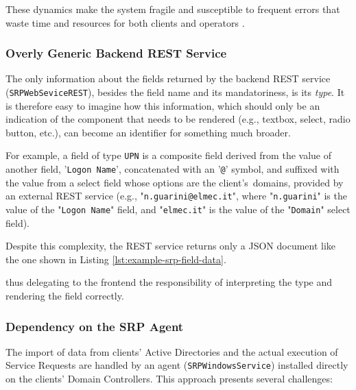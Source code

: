 These dynamics make the system fragile and susceptible to frequent errors that waste time and resources for both clients and operators \cite{benefits_issues_micro_frontends}.

\subsubsection{Overly Generic Backend REST Service}

The only information about the fields returned by the backend REST service (\texttt{SRPWebSeviceREST}), besides the field name and its mandatoriness, is its \textit{type}. It is therefore easy to imagine how this information, which should only be an indication of the component that needs to be rendered (e.g., textbox, select, radio button, etc.), can become an identifier for something much broader.

For example, a field of type \texttt{UPN} is a composite field derived from the value of another field, '\texttt{Logon Name}', concatenated with an '\texttt{@}' symbol, and suffixed with the value from a select field whose options are the client's~domains, provided by an external REST service (e.g., "\texttt{n.guarini@elmec.it}", where "\texttt{n.guarini}" is the value of the "\texttt{Logon Name}" field, and "\texttt{elmec.it}" is the value of the "\texttt{Domain}" select field). 

Despite this complexity, the REST service returns only a JSON document like the one shown in Listing \ref{lst:example-srp-field-data}.

thus delegating to the frontend the responsibility of interpreting the type and rendering the field correctly.

\subsubsection{Dependency on the SRP Agent}

The import of data from clients' Active Directories and the actual execution of Service Requests are handled by an agent (\texttt{SRPWindowsService}) installed directly on the clients' Domain Controllers. This approach presents several challenges:

